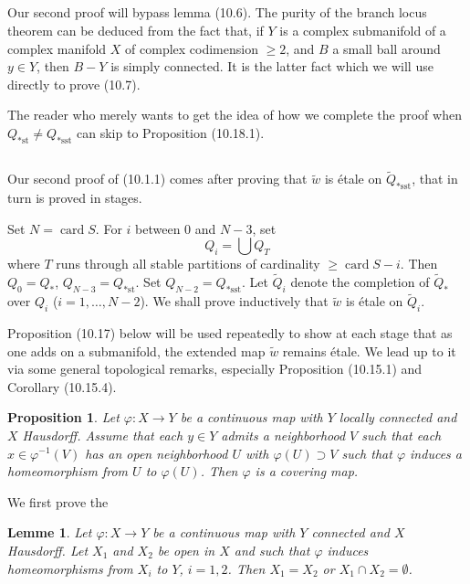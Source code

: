 \documentclass[12pt,a4paper]{article}
\theoremstyle{plain}
\newtheorem{lemma}[theorem]{Lemme}
\newtheorem{proposition}[theorem]{Proposition}
\theoremstyle{definition}
\theoremstyle{remark}
\DeclareMathOperator{\card}{card}
\begin{document}
\subsection{}
\label{10.9}

Our second proof will bypass lemma (10.6). The purity of the branch locus theorem can be deduced from the fact that, if $Y$ is a complex submanifold of a complex manifold $X$ of complex codimension $\geqslant 2$, and $B$ a small ball around $y \in Y$, then $B - Y$ is simply connected. It is the latter fact which we will use directly to prove (10.7).

The reader who merely wants to get the idea of how we complete the proof when $Q_{*\text{st}} \neq Q_{*\text{sst}}$ can skip to Proposition (10.18.1).

\subsection{}
\label{10.10}

Our second proof of (10.1.1) comes after proving that $\widetilde{w}$ is \'etale on $\widetilde{Q}_{*\text{sst}}$, that in turn is proved in stages.

Set $N = \card S$. For $i$ between $0$ and $N - 3$, set
\[
Q_i = \bigcup Q_T
\]
where $T$ runs through all stable partitions of cardinality $\geqslant \card S - i$. Then $Q_0 = Q_*$, $Q_{N-3} = Q_{*\text{st}}$. Set $Q_{N-2} = Q_{*\text{sst}}$. Let $\widetilde{Q}_i$ denote the completion of $\widetilde{Q}_*$ over $Q_i$ ($i = 1, \ldots, N - 2$). We shall prove inductively that $\widetilde{w}$ is \'etale on $\widetilde{Q}_i$.

Proposition (10.17) below will be used repeatedly to show at each stage that as one adds on a submanifold, the extended map $\widetilde{w}$ remains \'etale. We lead up to it via some general topological remarks, especially Proposition (10.15.1) and Corollary (10.15.4).

\begin{proposition}
\label{10.11}
Let $\varphi : X \to Y$ be a continuous map with $Y$ locally connected and $X$ Hausdorff. Assume that each $y \in Y$ admits a neighborhood $V$ such that each $x \in \varphi^{-1}(V)$ has an open neighborhood $U$ with $\varphi(U) \supset V$ such that $\varphi$ induces a homeomorphism from $U$ to $\varphi(U)$. Then $\varphi$ is a covering map.
\end{proposition}

We first prove the

\begin{lemma}
\label{10.11.1}
Let $\varphi : X \to Y$ be a continuous map with $Y$ connected and $X$ Hausdorff. Let $X_1$ and $X_2$ be open in $X$ and such that $\varphi$ induces homeomorphisms from $X_i$ to $Y$, $i = 1, 2$. Then $X_1 = X_2$ or $X_1 \cap X_2 = \emptyset$.
\end{lemma}
\end{document}
